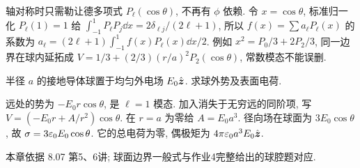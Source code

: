 轴对称时只需勒让德多项式 $P_\ell(\cos\theta)$, 不再有 $\phi$ 依赖. 令 $x=\cos\theta$, 标准归一化 $P_\ell(1)=1$ 给 $\int_{-1}^1P_\ell P_j\dd x=2\delta_{\ell j}/(2\ell+1)$, 所以 $f(x)=\sum a_\ell P_\ell(x)$ 的系数为 $a_\ell=(2\ell+1)\int_{-1}^1f(x)P_\ell(x)\dd x/2$. 例如 $x^2=P_0/3+2P_2/3$, 同一边界在球内延拓成 $V=1/3+(2/3)(r/a)^2P_2(\cos\theta)$, 常数模态不能误删.

\begin{example}
半径 $a$ 的接地导体球置于均匀外电场 $E_0\hat{\boldsymbol{z}}$. 求球外势及表面电荷.
\end{example}
\begin{solution}
远处的势为 $-E_0r\cos\theta$, 是 $\ell=1$ 模态. 加入消失于无穷远的同阶项, 写 $V=(-E_0r+A/r^2)\cos\theta$. 在 $r=a$ 为零给 $A=E_0a^3$. 径向场在球面为 $3E_0\cos\theta$, 故 $\sigma=3\varepsilon_0 E_0\cos\theta$. 它的总电荷为零, 偶极矩为 $4\pi\varepsilon_0 a^3E_0\hat{\boldsymbol{z}}$.
\end{solution}


本章依据 8.07 第5、6讲; 球面边界一般式与作业4完整给出的球腔题对应.
